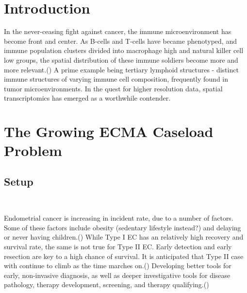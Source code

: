 \documentclass[Endo]{subfiles}
\begin{document}
\section{Introduction}\label{sec:intro}
\setcounter{page}{0}

In the never-ceasing fight against cancer, the immune microenvironment has become front and center. As B-cells and T-cells have became phenotyped, and immune population clusters divided into macrophage high and natural killer cell low groups, the spatial distribution of these immune soldiers become more and more relevant.(\cite{Makk:2021}) A prime example being tertiary lymphoid structures - distinct immune structures of varying immune cell composition, frequently found in tumor microenvironments. In the quest for higher resolution data, spatial transcriptomics has emerged as a worthwhile contender.


\hypertarget{The-Growing-ECMA-Caseload-Problem}{}
\section{The Growing ECMA Caseload Problem}\label{sec:growing}
\subsection{Setup}\label{subsec:setup}\

Endometrial cancer is increasing in incident rate, due to a number of factors. Some of these factors include obesity (sedentary lifestyle instead?) and delaying or never having children.(\cite{Shih:2021}) While Type I EC has an relatively high recovery and survival rate, the same is not true for Type II EC. Early detection and early resection are key to a high chance of survival. It is anticipated that Type II case with continue to climb as the time marches on.(\cite{McAl:2016})
Developing better tools for early, non-invasive diagnosis, as well as deeper investigative tools for disease pathology, therapy development, screening, and therapy qualifying.(\cite{Will:2021})




\hypertarget{Comparison-to-Existing-iTME-Knowledge}{}
\end{document}
